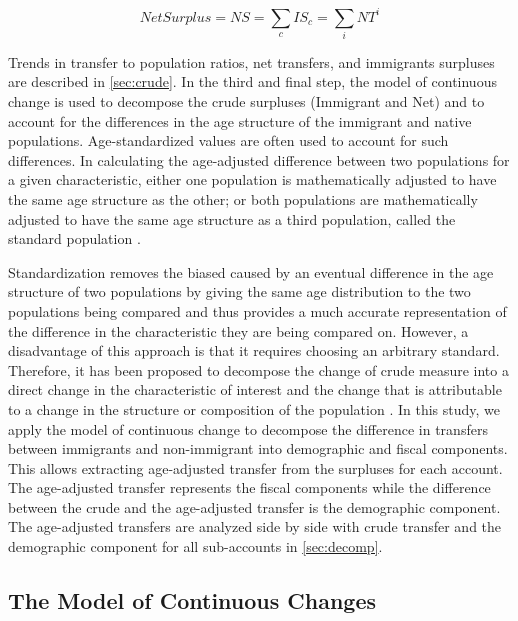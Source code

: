 \begin{equation}\label{eq:ns}
  Net Surplus = NS = \displaystyle\sum_{c}IS_{c} = \displaystyle\sum_{i}NT^{i}
\end{equation}

Trends in transfer to population ratios, net transfers, and immigrants surpluses are described in \autoref{sec:crude}.
In the third and final step, the model of continuous change \citep{Horiuchi:2008cn} is used to decompose the crude surpluses (Immigrant and Net) and to account for the differences in the age structure of the immigrant and native populations.
Age-standardized values are often used to account for such differences.
In calculating the age-adjusted difference between two populations for a given characteristic, either one population is mathematically adjusted to have the same age structure as the other; or both populations are mathematically adjusted to have the same age structure as a third population, called the standard population \citep{statCan:001}.

\vspace{0.7em}\par
Standardization removes the biased caused by an eventual difference in the age structure of two populations by giving the same age distribution to the two populations being compared and thus provides a much accurate representation of the difference in the characteristic they are being compared on.
However, a disadvantage of this approach is that it requires choosing an arbitrary standard.
Therefore, it has been proposed to decompose the change of crude measure into a direct change in the characteristic of interest and the change that is attributable to a change in the structure or composition of the population \citep{Prskawetz:2005dx}.
In this study, we apply the model of continuous change \citep{Horiuchi:2008cn} to decompose the difference in transfers between immigrants and non-immigrant into demographic and fiscal components.
This allows extracting age-adjusted transfer from the surpluses for each account.
The age-adjusted transfer represents the fiscal components while the difference between the crude and the age-adjusted transfer is the demographic component.
The age-adjusted transfers are analyzed side by side with crude transfer and the demographic component for all sub-accounts in \autoref{sec:decomp}.

\subsection{The Model of Continuous Changes}\label{sec:model}

